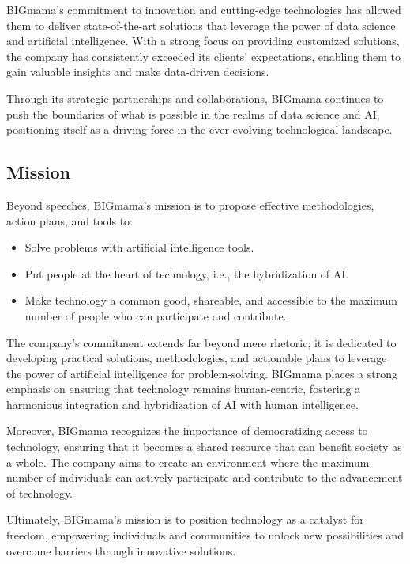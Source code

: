 BIGmama's commitment to innovation and cutting-edge technologies has allowed them to deliver state-of-the-art solutions that leverage the power of data science and artificial intelligence. With a strong focus on providing customized solutions, the company has consistently exceeded its clients' expectations, enabling them to gain valuable insights and make data-driven decisions.

Through its strategic partnerships and collaborations, BIGmama continues to push the boundaries of what is possible in the realms of data science and AI, positioning itself as a driving force in the ever-evolving technological landscape.

\subsection{Mission}

Beyond speeches, BIGmama's mission is to propose effective methodologies, action plans, and tools to:

\begin{itemize}
    \item Solve problems with artificial intelligence tools.
    \item Put people at the heart of technology, i.e., the hybridization of AI.
    \item Make technology a common good, shareable, and accessible to the maximum number of people who can participate and contribute.
\end{itemize}

The company's commitment extends far beyond mere rhetoric; it is dedicated to developing practical solutions, methodologies, and actionable plans to leverage the power of artificial intelligence for problem-solving. BIGmama places a strong emphasis on ensuring that technology remains human-centric, fostering a harmonious integration and hybridization of AI with human intelligence.

Moreover, BIGmama recognizes the importance of democratizing access to technology, ensuring that it becomes a shared resource that can benefit society as a whole. The company aims to create an environment where the maximum number of individuals can actively participate and contribute to the advancement of technology.

Ultimately, BIGmama's mission is to position technology as a catalyst for freedom, empowering individuals and communities to unlock new possibilities and overcome barriers through innovative solutions.

